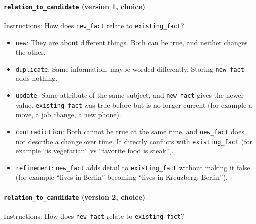 \documentclass[11pt]{article}
\begin{document}
\paragraph{\texttt{relation\_\allowbreak{}to\_\allowbreak{}candidate} (version 1, choice)}
Instructions: How does \texttt{new\_\allowbreak{}fact} relate to \texttt{existing\_\allowbreak{}fact}?

\begin{itemize}
\item \texttt{new}: They are about different things. Both can be true, and neither changes the other.
\item \texttt{duplicate}: Same information, maybe worded differently. Storing \texttt{new\_\allowbreak{}fact} adds nothing.
\item \texttt{update}: Same attribute of the same subject, and \texttt{new\_\allowbreak{}fact} gives the newer value. \texttt{existing\_\allowbreak{}fact} was true before but is no longer current (for example a move, a job change, a new phone).
\item \texttt{contradiction}: Both cannot be true at the same time, and \texttt{new\_\allowbreak{}fact} does not describe a change over time. It directly conflicts with \texttt{existing\_\allowbreak{}fact} (for example ``is vegetarian'' vs ``favorite food is steak'').
\item \texttt{refinement}: \texttt{new\_\allowbreak{}fact} adds detail to \texttt{existing\_\allowbreak{}fact} without making it false (for example ``lives in Berlin'' becoming ``lives in Kreuzberg, Berlin'').
\end{itemize}
\paragraph{\texttt{relation\_\allowbreak{}to\_\allowbreak{}candidate} (version 2, choice)}
Instructions: How does \texttt{new\_\allowbreak{}fact} relate to \texttt{existing\_\allowbreak{}fact}?
\end{document}
